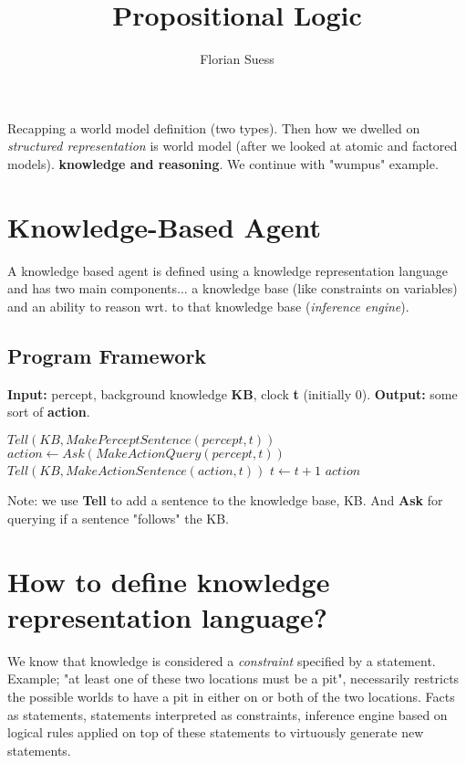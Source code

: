 \documentclass{article}
\begin{document}
\title{Propositional Logic}
\date{}
\author{Florian Suess}
\maketitle

Recapping a world model definition (two types). Then how we dwelled on \emph{structured representation} is world model (after we looked at atomic and factored models). \textbf{knowledge and reasoning}. We continue with "wumpus" example.

\section{Knowledge-Based Agent}
A knowledge based agent is defined using a knowledge representation language and has two main components... a knowledge base (like constraints on variables) and an ability to reason wrt. to that knowledge base (\emph{inference engine}).

\subsection{Program Framework}
\textbf{Input: } percept, background knowledge \textbf{KB}, clock \textbf{t} (initially 0). \textbf{Output: } some sort of \textbf{action}.

\begin{algorithmic}
	\STATE $Tell(KB, MakePerceptSentence(percept, t))$
	\STATE $action \leftarrow Ask(MakeActionQuery(percept, t))$
	\STATE $Tell(KB, MakeActionSentence(action, t))$
	\STATE $t \leftarrow t + 1$
	\RETURN $action$
\end{algorithmic}

Note: we use \textbf{Tell} to add a sentence to the knowledge base, KB. And \textbf{Ask} for querying if a sentence "follows" the KB.

\section{How to define knowledge representation language?}
We know that knowledge is considered a \emph{constraint} specified by a statement. Example; "at least one of these two locations must be a pit", necessarily restricts the possible worlds to have a pit in either on or both of the two locations. Facts as statements, statements interpreted as constraints, inference engine based on logical rules applied on top of these statements to virtuously generate new statements.
\end{document}
